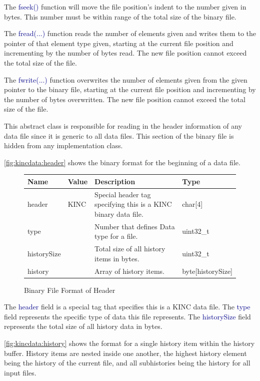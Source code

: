 \documentclass[10pt]{article}
\providecommand{\h}[1]{\textcolor{darkblue}{#1}}
\begin{document}
The \h{fseek()} function will move the file position's indent to the number 
given in bytes. This number must be within range of the total size of the 
binary file.

The \h{fread(...)} function reads the number of elements given and writes them 
to the pointer of that element type given, starting at the current file 
position and incrementing by the number of bytes read. The new file position 
cannot exceed the total size of the file.

The \h{fwrite(...)} function overwrites the number of elements given from the 
given pointer to the binary file, starting at the current file position and 
incrementing by the number of bytes overwritten. The new file position cannot 
exceed the total size of the file.

This abstract class is responsible for reading in the header information of any 
data file since it is generic to all data files. This section of the binary file 
is hidden from any implementation class.

\autoref{fig:kincdata:header} shows the binary format for the beginning 
of a data file.

\begin{figure}[H]
\begin{mdframed}[style=btable]
\begin{tabularx}{\textwidth}{|l|l|X|l|}
\hline
\textbf{Name} & \textbf{Value} & \textbf{Description} & \textbf{Type} \\
\hline
header & KINC & Special header tag specifying this is a KINC binary data file. 
& char[4] \\
\hline
type & & Number that defines Data type for a file. & uint32\_t \\
\hline
historySize & & Total size of all history items in bytes. & uint32\_t \\
\hline
history & & Array of history items. & byte[historySize] \\
\hline
\end{tabularx}
\end{mdframed}
\caption{Binary File Format of Header}
\label{fig:kincdata:header}
\end{figure}

The \h{header} field is a special tag that specifies this is a KINC data file. 
The \h{type} field represents the specific type of data this file represents. 
The \h{historySize} field represents the total size of all history data in 
bytes.

\autoref{fig:kincdata:history} shows the format for a single history item 
within the history buffer. History items are nested inside one another, the 
highest history element being the history of the current file, and all 
subhistories being the history for all input files.
\end{document}
